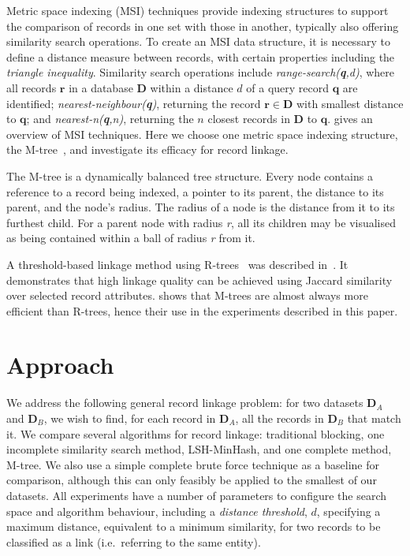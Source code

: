\documentclass{llncs}
\begin{document}
Metric space indexing (MSI) techniques provide indexing structures to
support the comparison of records in one set with those in another,
typically also offering similarity search operations. To create an MSI
data structure, it is necessary to define a distance measure between
records, with certain properties including the \emph{triangle
inequality}. Similarity search operations include
\emph{range-search(\textbf{q},d)}, where all records $\mathbf{r}$
in a database $\mathbf{D}$ within a distance $d$ of a query record
$\mathbf{q}$ are identified; \emph{nearest-neighbour(\textbf{q})},
returning the record $\mathbf{r} \in \mathbf{D}$ with smallest
distance to $\mathbf{q}$; and \emph{nearest-n(\textbf{q},n)}, returning
the $n$ closest records in $\mathbf{D}$ to $\mathbf{q}$.
\cite{Zezula2010} gives an overview of MSI techniques. Here we choose
one metric space indexing structure, the M-tree~\cite{Ciaccia97indexingmetric},
and investigate its efficacy for record linkage.

The M-tree is a dynamically balanced tree structure. Every node contains
a reference to a record being indexed, a pointer to its parent, the
distance to its parent, and the node's radius. The radius of a node is
the distance from it to its furthest child. For a parent node with
radius \textit{r}, all its children may be visualised as being contained
within a ball of radius \textit{r} from it.

A threshold-based linkage method using R-trees~\cite{Hjaltason1998}
was described in~\cite{Li2006}. It demonstrates that high linkage
quality can be achieved using Jaccard similarity over selected record
attributes. \cite{Ciaccia97indexingmetric} shows that M-trees are
almost always more efficient than R-trees, hence their use in the
experiments described in this paper.


\section{Approach}
\label{sec-approach}

We address the following general record linkage problem: for two
datasets $\mathbf{D}_A$ and $\mathbf{D}_B$, we wish to find, for each
record in $\mathbf{D}_A$, all the records in $\mathbf{D}_B$ that match
it. We compare several algorithms for record linkage: traditional
blocking, one incomplete similarity search method, LSH-MinHash, and
one complete method, M-tree. We also use a
simple complete brute force technique as a baseline for comparison,
although this can only feasibly be applied to the smallest of our
datasets. All experiments have a number of parameters to configure
the search space and algorithm behaviour, including a
\emph{distance threshold}, $d$, specifying a maximum distance,
equivalent to a minimum similarity, for two records to be classified
as a link (i.e.\ referring to the same entity).
\end{document}
